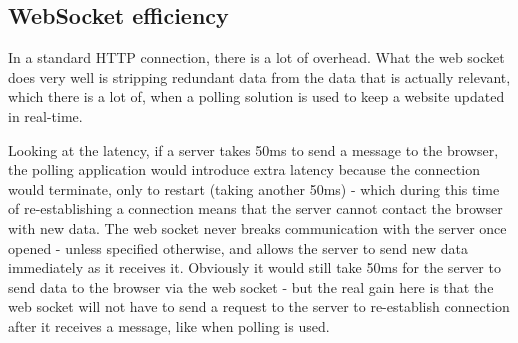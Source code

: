 \subsection{WebSocket efficiency}


In a standard HTTP connection, there is a lot of overhead\cite{lubbersgreco}. 
What the web socket does very well is stripping redundant data from the data 
that is actually relevant, which there is a lot of, when a polling solution is 
used to keep a website updated in real-time\cite{lubbersgreco}. 

Looking at the latency, if a server takes 50ms to send a message to the 
browser, the polling application would introduce extra latency because the 
connection would terminate, only to restart (taking another 50ms) - which 
during this time of re-establishing a connection means that the server cannot 
contact the browser with new data\cite{lubbersgreco}. The web socket never 
breaks communication with the server once opened - unless specified otherwise, 
and allows the server to send new data immediately as it receives 
it\cite{lubbersgreco}. Obviously it would still take 50ms for the server to 
send data to the browser via the web socket - but the real gain here is that 
the web socket will not have to send a request to the server to re-establish 
connection after it receives a message, like when polling is 
used\cite{lubbersgreco}.